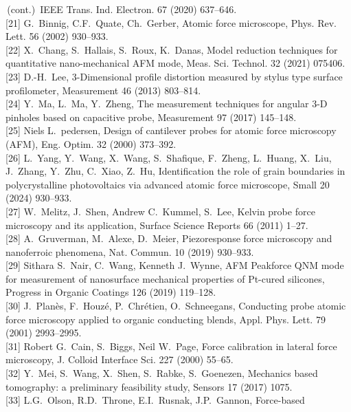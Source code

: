 \documentclass[11pt]{article}
\begin{document}
\begin{footnotesize}
\noindent
[20]\,(cont.)\ IEEE Trans. Ind. Electron. 67 (2020) 637--646.\\[2pt]
[21] G.~Binnig, C.F.~Quate, Ch.~Gerber, Atomic force microscope,
Phys. Rev. Lett. 56 (2002) 930--933.\\[2pt]
[22] X.~Chang, S.~Hallais, S.~Roux, K.~Danas, Model reduction
techniques for quantitative nano-mechanical AFM mode, Meas. Sci.
Technol. 32 (2021) 075406.\\[2pt]
[23] D.-H.~Lee, 3-Dimensional profile distortion measured by stylus
type surface profilometer, Measurement 46 (2013) 803--814.\\[2pt]
[24] Y.~Ma, L.~Ma, Y.~Zheng, The measurement techniques for angular
3-D pinholes based on capacitive probe, Measurement 97 (2017)
145--148.\\[2pt]
[25] Niels L.~pedersen, Design of cantilever probes for atomic
force microscopy (AFM), Eng. Optim. 32 (2000) 373--392.\\[2pt]
[26] L.~Yang, Y.~Wang, X.~Wang, S.~Shafique, F.~Zheng, L.~Huang,
X.~Liu, J.~Zhang, Y.~Zhu, C.~Xiao, Z.~Hu, Identification the role
of grain boundaries in polycrystalline photovoltaics via advanced
atomic force microscope, Small 20 (2024) 930--933.\\[2pt]
[27] W.~Melitz, J.~Shen, Andrew C.~Kummel, S.~Lee, Kelvin probe
force microscopy and its application, Surface Science Reports 66
(2011) 1--27.\\[2pt]
[28] A.~Gruverman, M.~Alexe, D.~Meier, Piezoresponse force
microscopy and nanoferroic phenomena, Nat. Commun. 10 (2019)
930--933.\\[2pt]
[29] Sithara S.~Nair, C.~Wang, Kenneth J.~Wynne, AFM Peakforce QNM
mode for measurement of nanosurface mechanical properties of
Pt-cured silicones, Progress in Organic Coatings 126 (2019)
119--128.\\[2pt]
[30] J.~Planès, F.~Houzé, P.~Chrétien, O.~Schneegans, Conducting
probe atomic force microscopy applied to organic conducting blends,
Appl. Phys. Lett. 79 (2001) 2993--2995.\\[2pt]
[31] Robert G.~Cain, S.~Biggs, Neil W.~Page, Force calibration in
lateral force microscopy, J. Colloid Interface Sci. 227 (2000)
55--65.\\[2pt]
[32] Y.~Mei, S.~Wang, X.~Shen, S.~Rabke, S.~Goenezen, Mechanics
based tomography: a preliminary feasibility study, Sensors 17 (2017)
1075.\\[2pt]
[33] L.G.~Olson, R.D.~Throne, E.I.~Rusnak, J.P.~Gannon, Force-based

\end{footnotesize}
\end{document}
